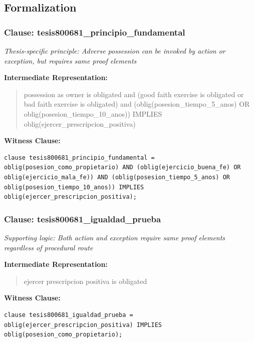 \documentclass[11pt,a4paper]{article}
\begin{document}
\subsection{Formalization}

\subsubsection{Clause: tesis800681\_principio\_fundamental}

\textit{Thesis-specific principle: Adverse possession can be invoked by action or exception, but requires same proof elements}

\textbf{Intermediate Representation:}

\begin{quote}
possession as owner is obligated and (good faith exercise is obligated or bad faith exercise is obligated) and (oblig(posesion\_tiempo\_5\_anos) OR oblig(posesion\_tiempo\_10\_anos)) IMPLIES oblig(ejercer\_prescripcion\_positiva)
\end{quote}

\textbf{Witness Clause:}

\begin{lstlisting}[style=witnessstyle, language=Witness]
clause tesis800681_principio_fundamental = oblig(posesion_como_propietario) AND (oblig(ejercicio_buena_fe) OR oblig(ejercicio_mala_fe)) AND (oblig(posesion_tiempo_5_anos) OR oblig(posesion_tiempo_10_anos)) IMPLIES oblig(ejercer_prescripcion_positiva);
\end{lstlisting}

\subsubsection{Clause: tesis800681\_igualdad\_prueba}

\textit{Supporting logic: Both action and exception require same proof elements regardless of procedural route}

\textbf{Intermediate Representation:}

\begin{quote}
ejercer prescripcion positiva is obligated
\end{quote}

\textbf{Witness Clause:}

\begin{lstlisting}[style=witnessstyle, language=Witness]
clause tesis800681_igualdad_prueba = oblig(ejercer_prescripcion_positiva) IMPLIES oblig(posesion_como_propietario);
\end{lstlisting}
\end{document}
